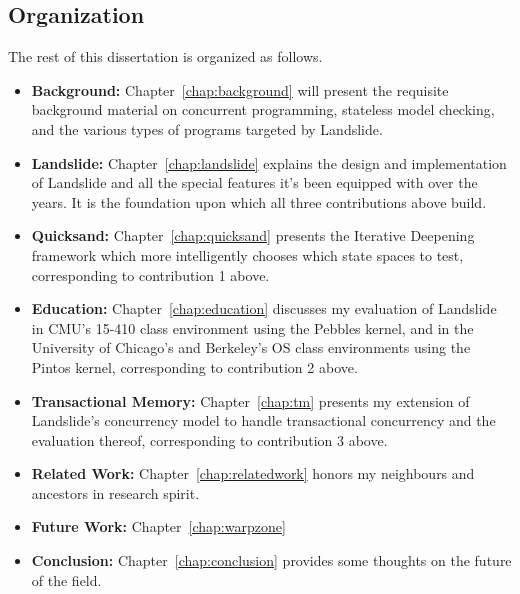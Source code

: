\subsection{Organization}

The rest of this dissertation is organized as follows.

\begin{itemize}
	\item {\bf Background:} Chapter~\ref{chap:background} will present the requisite background material on concurrent programming, stateless model checking, and the various types of programs targeted by Landslide.
	\item {\bf Landslide:} Chapter~\ref{chap:landslide} explains the design and implementation of Landslide
		and all the special features it's been equipped with over the years.
		It is the foundation upon which all three contributions above build.
	\item {\bf Quicksand:} Chapter~\ref{chap:quicksand} presents the Iterative Deepening framework which more intelligently chooses which state spaces to test, corresponding to contribution 1 above.
	\item {\bf Education:} Chapter~\ref{chap:education} discusses my evaluation of Landslide
		in CMU's 15-410 class environment using the Pebbles kernel,
		and in the University of Chicago's and Berkeley's OS class environments using the Pintos kernel,
		corresponding to contribution 2 above.
	\item {\bf Transactional Memory:} Chapter~\ref{chap:tm} presents my extension of Landslide's concurrency model to handle transactional concurrency and the evaluation thereof, corresponding to contribution 3 above.
	\item {\bf Related Work:} Chapter~\ref{chap:relatedwork} honors my neighbours and ancestors in research spirit.
	\item {\bf Future Work:} Chapter~\ref{chap:warpzone} %
	\item {\bf Conclusion:} Chapter~\ref{chap:conclusion} provides some thoughts on the future of the field.
\end{itemize}

